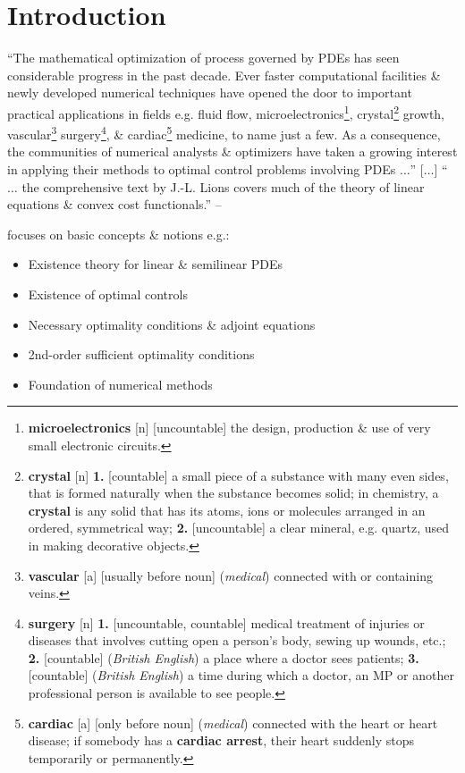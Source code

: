 \documentclass[oneside]{book}
\numberwithin{equation}{section}
\begin{document}
\section{Introduction}
``The mathematical optimization of process governed by PDEs has seen considerable progress in the past decade. Ever faster computational facilities \& newly developed numerical techniques have opened the door to important practical applications in fields e.g. fluid flow, microelectronics\footnote{\textbf{microelectronics} [n] [uncountable] the design, production \& use of very small electronic circuits.}, crystal\footnote{\textbf{crystal} [n] \textbf{1.} [countable] a small piece of a substance with many even sides, that is formed naturally when the substance becomes solid; in chemistry, a \textbf{crystal} is any solid that has its atoms, ions or molecules arranged in an ordered, symmetrical way; \textbf{2.} [uncountable] a clear mineral, e.g. quartz, used in making decorative objects.} growth, vascular\footnote{\textbf{vascular} [a] [usually before noun] (\textit{medical}) connected with or containing veins.} surgery\footnote{\textbf{surgery} [n] \textbf{1.} [uncountable, countable] medical treatment of injuries or diseases that involves cutting open a person's body, sewing up wounds, etc.; \textbf{2.} [countable] (\textit{British English}) a place where a doctor sees patients; \textbf{3.} [countable] (\textit{British English}) a time during which a doctor, an MP or another professional person is available to see people.}, \& cardiac\footnote{\textbf{cardiac} [a] [only before noun] (\textit{medical}) connected with the heart or heart disease; if somebody has a \textbf{cardiac arrest}, their heart suddenly stops temporarily or permanently.} medicine, to name just a few. As a consequence, the communities of numerical analysts \& optimizers have taken a growing interest in applying their methods to optimal control problems involving PDEs $\ldots$'' [$\ldots$] ``$\ldots$ the comprehensive text by J.-L. Lions \cite{Lions1971} covers much of the theory of linear equations \& convex cost functionals.'' -- \cite[Preface to the German edition, p. xiii]{Troltzsch2010}

\cite{Troltzsch2010} focuses on basic concepts \& notions e.g.:
\begin{itemize}
	\item Existence theory for linear \& semilinear PDEs
	\item Existence of optimal controls
	\item Necessary optimality conditions \& adjoint equations
	\item 2nd-order sufficient optimality conditions
	\item Foundation of numerical methods
\end{itemize}
\end{document}
